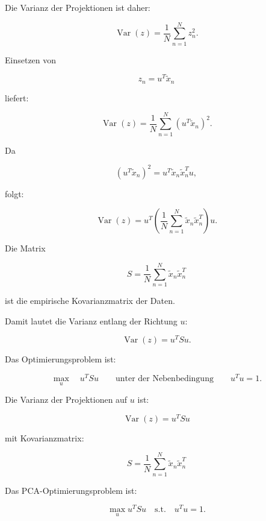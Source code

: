 \documentclass[11pt,a4paper]{scrartcl}
\begin{document}
\begin{calculationbox}
    Die Varianz der Projektionen ist daher:

    \[
        \operatorname{Var}(z)
        =
        \frac{1}{N}
        \sum_{n=1}^{N}
        z_n^2.
    \]

    Einsetzen von

    \[
        z_n = u^T\tilde x_n
    \]

    liefert:

    \[
        \operatorname{Var}(z)
        =
        \frac{1}{N}
        \sum_{n=1}^{N}
        (u^T\tilde x_n)^2.
    \]

    Da

    \[
        (u^T\tilde x_n)^2
        =
        u^T\tilde x_n \tilde x_n^T u,
    \]

    folgt:

    \[
        \operatorname{Var}(z)
        =
        u^T
        \left(
            \frac{1}{N}
            \sum_{n=1}^{N}
            \tilde x_n \tilde x_n^T
        \right)
        u.
    \]
\end{calculationbox}

\begin{calculationbox}
    Die Matrix

    \[
        S
        =
        \frac{1}{N}
        \sum_{n=1}^{N}
        \tilde x_n \tilde x_n^T
    \]

    ist die empirische Kovarianzmatrix der Daten.

    Damit lautet die Varianz entlang der Richtung \(u\):

    \[
        \operatorname{Var}(z)
        =
        u^T S u.
    \]

    Das Optimierungsproblem ist:

    \[
        \max_u
        \quad
        u^T S u
        \qquad
        \text{unter der Nebenbedingung}
        \qquad
        u^Tu=1.
    \]
\end{calculationbox}

\begin{answerbox}
    Die Varianz der Projektionen auf \(u\) ist:

    \[
        \boxed{
            \operatorname{Var}(z)
            =
            u^T S u
        }
    \]

    mit Kovarianzmatrix:

    \[
        \boxed{
            S
            =
            \frac{1}{N}
            \sum_{n=1}^{N}
            \tilde x_n \tilde x_n^T
        }
    \]

    Das PCA-Optimierungsproblem ist:

    \[
        \boxed{
            \max_{u}
            u^T S u
            \quad
            \text{s.t.}
            \quad
            u^T u = 1.
        }
    \]
\end{answerbox}
\end{document}
